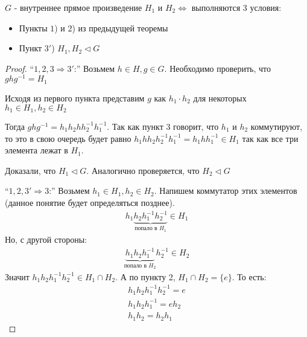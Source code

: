 \begin{theorem-non}
    $G$ - внутреннее прямое произведение $H_1$ и $H_2 \Longleftrightarrow$ выполняются 3 условия: 
    \begin{itemize}
        \item Пункты $1$) и $2$) из предыдущей теоремы
        \item Пункт $3'$) $H_1, H_2 \lhd G$
    \end{itemize}
\end{theorem-non}
\begin{proof}
    \item[]``$1, 2, 3 \Longrightarrow 3'$:'' Возьмем $h \in H, g \in G$. Необходимо
    проверить, что $ghg^{-1} = H_1$
    
    Исходя из первого пункта представим $g$ как $h_1 \cdot h_2$ для некоторых 
    $h_1 \in H_1, h_2 \in H_2$

    Тогда $ghg^{-1} = h_1 h_2 h h_2^{-1} h_1 ^{-1}$. Так как пункт 3 говорит, что $h_1$ и $h_2$ коммутируют, то это
    в свою очередь будет равно $h_1 h h_2 h_2^{-1} h_1^{-1} = h_1 h h_1^{-1} \in H_1$ так как все три элемента лежат в $H_1$. 

    Доказали, что $H_1 \lhd G$. Аналогично проверяется, что $H_2 \lhd G$
    \item[]``$1, 2, 3' \Longrightarrow 3$:'' Возьмем $h_1 \in H_1, h_2 \in H_2$. Напишем коммутатор 
    этих элементов (данное понятие будет определяться позднее). 
    \begin{gather*}
        h_1 \underbrace{h_2 h_1^{-1} h_2^{-1}}_{\text{попало в } H_1} \in H_1
    \end{gather*} 
    Но, с другой стороны: 
    \begin{gather*}
        \underbrace{h_1 h_2 h_1^{-1}}_{\text{попало в } H_2} h_2^{-1} \in H_2
    \end{gather*} 
    Значит $h_1 h_2 h_1^{-1} h_2^{-1} \in H_1 \cap H_2$. А по пункту 2, $H_1 \cap H_2 = \{e\}$. То есть: 
    \begin{gather*}
        h_1 h_2 h_1^{-1} h_2^{-1} = e \\
        h_1 h_2 h_1^{-1} = e h_2 \\
        h_1 h_2 = h_2 h_1
    \end{gather*}
\end{proof}
